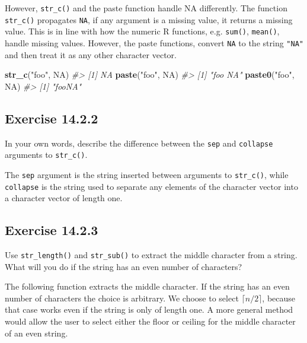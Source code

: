 \documentclass[]{book}
\newenvironment{Shaded}{\begin{snugshade}}{\end{snugshade}}
\newcommand{\CommentTok}[1]{\textcolor[rgb]{0.56,0.35,0.01}{\textit{#1}}}
\newcommand{\KeywordTok}[1]{\textcolor[rgb]{0.13,0.29,0.53}{\textbf{#1}}}
\newcommand{\NormalTok}[1]{#1}
\newcommand{\OtherTok}[1]{\textcolor[rgb]{0.56,0.35,0.01}{#1}}
\newcommand{\StringTok}[1]{\textcolor[rgb]{0.31,0.60,0.02}{#1}}
\theoremstyle{plain}
\theoremstyle{remark}
\theoremstyle{definition}
\theoremstyle{definition}
\theoremstyle{definition}
\theoremstyle{remark}
\begin{document}
However, \texttt{str\_c()} and the paste function handle NA differently.
The function \texttt{str\_c()} propagates \texttt{NA}, if any argument
is a missing value, it returns a missing value. This is in line with how
the numeric R functions, e.g. \texttt{sum()}, \texttt{mean()}, handle
missing values. However, the paste functions, convert \texttt{NA} to the
string \texttt{"NA"} and then treat it as any other character vector.

\begin{Shaded}
\begin{Highlighting}[]
\KeywordTok{str_c}\NormalTok{(}\StringTok{"foo"}\NormalTok{, }\OtherTok{NA}\NormalTok{)}
\CommentTok{#> [1] NA}
\KeywordTok{paste}\NormalTok{(}\StringTok{"foo"}\NormalTok{, }\OtherTok{NA}\NormalTok{)}
\CommentTok{#> [1] "foo NA"}
\KeywordTok{paste0}\NormalTok{(}\StringTok{"foo"}\NormalTok{, }\OtherTok{NA}\NormalTok{)}
\CommentTok{#> [1] "fooNA"}
\end{Highlighting}
\end{Shaded}

\hypertarget{exercise-14.2.2}{%
\subsection*{\texorpdfstring{Exercise
{14.2.2}}{Exercise 14.2.2}}\label{exercise-14.2.2}}

In your own words, describe the difference between the \texttt{sep} and
\texttt{collapse} arguments to \texttt{str\_c()}.

The \texttt{sep} argument is the string inserted between arguments to
\texttt{str\_c()}, while \texttt{collapse} is the string used to
separate any elements of the character vector into a character vector of
length one.

\hypertarget{exercise-14.2.3}{%
\subsection*{\texorpdfstring{Exercise
{14.2.3}}{Exercise 14.2.3}}\label{exercise-14.2.3}}

Use \texttt{str\_length()} and \texttt{str\_sub()} to extract the middle
character from a string. What will you do if the string has an even
number of characters?

The following function extracts the middle character. If the string has
an even number of characters the choice is arbitrary. We choose to
select \(\lceil n / 2 \rceil\), because that case works even if the
string is only of length one. A more general method would allow the user
to select either the floor or ceiling for the middle character of an
even string.
\end{document}
